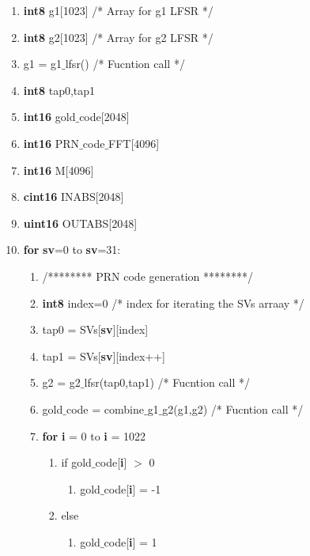 \documentclass[journal,10pt,onecolumn]{article}
\begin{document}
\begin{enumerate}
    \item[] \textbf{int8} g1[1023]   \hspace{5mm} /*  Array for g1 LFSR */
    \item[] \textbf{int8} g2[1023]   \hspace{5mm} /* Array for g2 LFSR */
    \item[] g1 =  g1$\_$lfsr()       \hspace{5mm} /* Fucntion call */
    \item[] \textbf{int8} tap0,tap1
    \item[] \textbf{int16} gold$\_$code[2048]
    \item[] \textbf{int16} PRN$\_$code$\_$FFT[4096]
    \item[] \textbf{int16} M[4096]
    \item[] \textbf{cint16} INABS[2048]
    \item[] \textbf{uint16} OUTABS[2048]
  



    \item[] \textbf{for} \textbf{sv}=0 to \textbf{sv}=31: 
	\begin{enumerate}
    \renewcommand{\labelenumii}{\roman{enumii}}
        \item[] /******** PRN code generation ********/
        \item[] \textbf{int8} index=0    \hspace{5mm} /* index for iterating the SVs arraay */ 
        \item[] tap0 = SVs[\textbf{sv}][index]
        \item[] tap1 = SVs[\textbf{sv}][index++]
        \item[] g2 = g2$\_$lfsr(tap0,tap1)   /* Fucntion call */
        \item[] gold$\_$code = combine$\_$g1$\_$g2(g1,g2)  /* Fucntion call */
        \item[] \textbf{for} \textbf{i} = 0 to \textbf{i} = 1022
        \begin{enumerate}
            \item[] if gold$\_$code[\textbf{i}] $>$  0 
            \begin{enumerate}
                \item[]  gold$\_$code[\textbf{i}] = -1
            \end{enumerate}
            \item[] else
            \begin{enumerate}
                \item[]  gold$\_$code[\textbf{i}] = 1
            \end{enumerate}
        \end{enumerate} 


\end{enumerate}
\end{enumerate}
\end{document}
